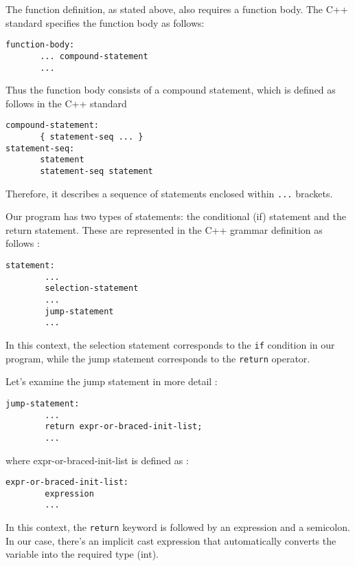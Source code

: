 The function definition, as stated above, also requires a function body. The C++
standard specifies the function body as follows: 
\citep[dcl.fct.def.general]{standard:cpp20}
\begin{adjustwidth}{0em}{0em}
\begin{verbatim}
function-body:
       ... compound-statement
       ...
\end{verbatim}
\end{adjustwidth}
Thus the function body consists of a compound statement, which is defined as follows in the C++ standard \citep[stmt.block]{standard:cpp20}
\begin{adjustwidth}{0em}{0em}
\begin{verbatim}
compound-statement:
       { statement-seq ... }
statement-seq:
       statement
       statement-seq statement
\end{verbatim}
\end{adjustwidth}
Therefore, it describes a sequence of statements enclosed within
\texttt{{...}} brackets. 

Our program has two types of statements: the conditional (if) statement and the
return statement. These are represented in the C++ grammar definition as follows
\citep[stmt.pre]{standard:cpp20}: 
\begin{adjustwidth}{0em}{0em}
\begin{verbatim}
statement:
        ...
        selection-statement
        ...
        jump-statement
        ...
\end{verbatim}
\end{adjustwidth}
In this context, the selection statement corresponds to the \texttt{if}
condition in our program, while the jump statement corresponds to the
\texttt{return} operator. 

Let's examine the jump statement in more detail
\citep[stmt.jump.general]{standard:cpp20}: 
\begin{adjustwidth}{0em}{0em}
\begin{verbatim}
jump-statement:
        ...
        return expr-or-braced-init-list;
        ...
\end{verbatim}
\end{adjustwidth}
where expr-or-braced-init-list is defined as
\citep[dcl.init.general]{standard:cpp20}: 
\begin{adjustwidth}{0em}{0em}
\begin{verbatim}
expr-or-braced-init-list:
        expression
        ...
\end{verbatim}
\end{adjustwidth}
In this context, the \texttt{return} keyword is followed by an
expression and a semicolon. In our case, there's an implicit cast expression
that automatically converts the variable into the required type (int). 

